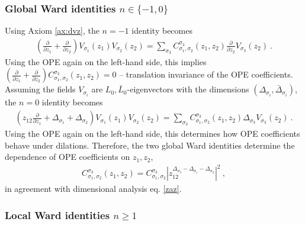 \documentclass[12pt, a4paper, notitlepage, twoside]{report}
\numberwithin{equation}{section}
\theoremstyle{break}
\begin{document}
\subsubsection{Global Ward identities $n\in\{-1,0\}$}

Using Axiom \ref{ax:dvz}, the $n=-1$ identity becomes 
 \begin{align}
  \left(\frac{\partial}{\partial z_1} +\frac{\partial}{\partial z_2}\right) V_{\sigma_1}(z_1)V_{\sigma_2}(z_2) = \sum_{\sigma_3} C_{\sigma_1,\sigma_2}^{\sigma_3}(z_1,z_2) \frac{\partial}{\partial z_2} V_{\sigma_3}(z_2)\ .
 \end{align}
Using the OPE again on the left-hand side, this implies $\left(\frac{\partial}{\partial z_1} +\frac{\partial}{\partial z_2}\right) C_{\sigma_1,\sigma_2}^{\sigma_3}(z_1,z_2)=0$ -- translation invariance of the OPE coefficients. 
Assuming the fields $V_{\sigma_i}$ are  $L_0,\bar L_0$-eigenvectors with the dimensions $(\Delta_{\sigma_i}, \bar\Delta_{\sigma_i})$, the $n=0$ identity becomes 
\begin{align}
 \left(z_{12}\frac{\partial}{\partial z_1} + \Delta_{\sigma_1}+\Delta_{\sigma_2}\right) V_{\sigma_1}(z_1)V_{\sigma_2}(z_2) = \sum_{\sigma_3} C_{\sigma_1,\sigma_2}^{\sigma_3}(z_1,z_2) \Delta_{\sigma_3} V_{\sigma_3}(z_2)\ .
\end{align}
Using the OPE again on the left-hand side, this
determines how OPE coefficients behave under dilations. 
Therefore, the two global Ward identities determine the dependence of OPE coefficients on $z_1,z_2$,
\begin{align}
 C_{\sigma_1,\sigma_2}^{\sigma_3}(z_1,z_2) = C_{\sigma_1,\sigma_2}^{\sigma_3} 
 \left| z_{12}^{\Delta_{{\sigma_3}}-\Delta_{\sigma_1}-\Delta_{\sigma_2}} \right|^2 
 \ ,
 \label{eq:coz}
\end{align}
in agreement with dimensional analysis eq. \eqref{zaz}.

\subsubsection{Local Ward identities $n\geq 1$}
\end{document}
